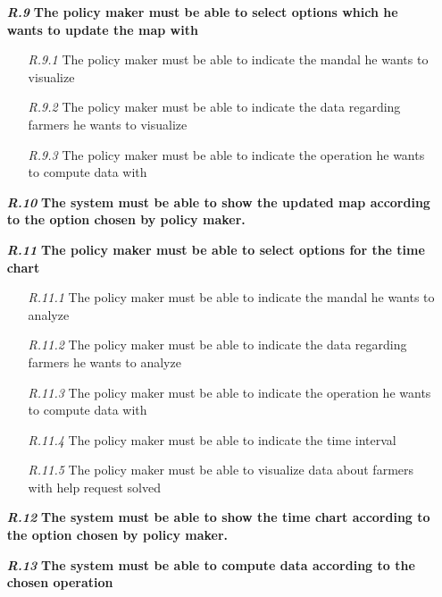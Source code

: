 \begin{itemize}
        \item[\textbf{\textit{R.9}}] \textbf{The policy maker must be able to select options which he wants to update the map with}
        \begin{itemize}
            \item [\textit{R.9.1}] The policy maker must be able to indicate the mandal he wants to visualize
	        \item [\textit{R.9.2}] The policy maker must be able to indicate the data regarding farmers he wants to visualize
	        \item [\textit{R.9.3}] The policy maker must be able to indicate the operation he wants to compute data with
        \end{itemize}
        \item [\textbf{\textit{R.10}}] \textbf{The system must be able to show the updated map according to the option chosen by policy maker.}
        \item [\textbf{\textit{R.11}}] \textbf{The policy maker must be able to select options for the time chart}
        \begin{itemize}
            \item [\textit{R.11.1}] The policy maker must be able to indicate the mandal he wants to analyze
            \item [\textit{R.11.2}] The policy maker must be able to indicate the data regarding farmers he wants to analyze
            \item [\textit{R.11.3}] The policy maker must be able to indicate the operation he wants to compute data with
            \item [\textit{R.11.4}] The policy maker must be able to indicate the time interval
            \item [\textit{R.11.5}] The policy maker must be able to visualize data about farmers with help request solved
        \end{itemize}
        \item [\textbf{\textit{R.12}}] \textbf{The system must be able to show the time chart according to the option chosen by policy maker.}
        \item [\textbf{\textit{R.13}}]\textbf{The system must be able to compute data according to the chosen operation}
        

\end{itemize}
